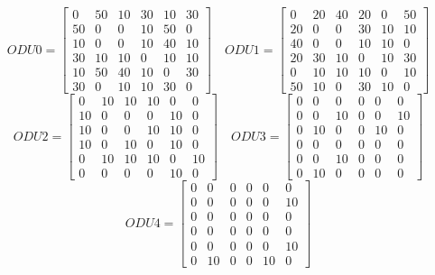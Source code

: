\[
ODU0=
  \begin{bmatrix}
    0 & 50 & 10 & 30 & 10 & 30 \\
    50 & 0 & 0 & 10 & 50 & 0 \\
    10 & 0 & 0 & 10 & 40 & 10 \\
    30 & 10 & 10 & 0 & 10 & 10 \\
    10 & 50 & 40 & 10 & 0 & 30 \\
    30 & 0 & 10 & 10 & 30 & 0
  \end{bmatrix}
\quad ODU1=
  \begin{bmatrix}
    0 & 20 & 40 & 20 & 0 & 50 \\
    20 & 0 & 0 & 30 & 10 & 10 \\
    40 & 0 & 0 & 10 & 10 & 0 \\
    20 & 30 & 10 & 0 & 10 & 30 \\
    0 & 10 & 10 & 10 & 0 & 10 \\
    50 & 10 & 0 & 30 & 10 & 0
  \end{bmatrix}
\]
\[
ODU2=
  \begin{bmatrix}
    0 & 10 & 10 & 10 & 0 & 0 \\
    10 & 0 & 0 & 0 & 10 & 0 \\
    10 & 0 & 0 & 10 & 10 & 0 \\
    10 & 0 & 10 & 0 & 10 & 0 \\
    0 & 10 & 10 & 10 & 0 & 10 \\
    0 & 0 & 0 & 0 & 10 & 0
  \end{bmatrix}
\quad ODU3=
  \begin{bmatrix}
    0 & 0 & 0 & 0 & 0 & 0 \\
    0 & 0 & 10 & 0 & 0 & 10 \\
    0 & 10 & 0 & 0 & 10 & 0 \\
    0 & 0 & 0 & 0 & 0 & 0 \\
    0 & 0 & 10 & 0 & 0 & 0 \\
    0 & 10 & 0 & 0 & 0 & 0
  \end{bmatrix}
\]
\[
ODU4=
  \begin{bmatrix}
    0 & 0 & 0 & 0 & 0 & 0 \\
    0 & 0 & 0 & 0 & 0 & 10 \\
    0 & 0 & 0 & 0 & 0 & 0 \\
    0 & 0 & 0 & 0 & 0 & 0 \\
    0 & 0 & 0 & 0 & 0 & 10 \\
    0 & 10 & 0 & 0 & 10 & 0
  \end{bmatrix}
\]

